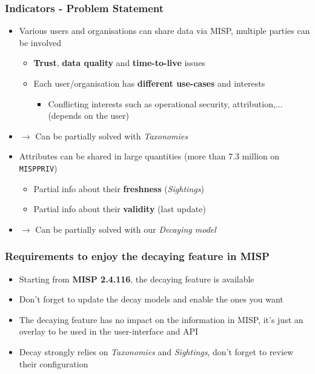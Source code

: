 \begin{frame}
\frametitle{Indicators - Problem Statement}
    \begin{itemize}
        \item Various users and organisations can share data via MISP, multiple parties can be involved
        \begin{itemize}
            \item \textbf{Trust}, \textbf{data quality} and \textbf{time-to-live} issues
            \item Each user/organisation has \textbf{different use-cases} and interests
                \begin{itemize}
                    \item Conflicting interests such as operational security, attribution,... (depends on the user)
                \end{itemize}
        \end{itemize}
        \item[] $\rightarrow$ Can be partially solved with \textit{Taxonomies}
        \pause
        \vspace{0.5cm}
        \item Attributes can be shared in large quantities (more than 7.3 million on \texttt{MISPPRIV})
        \begin{itemize}
            \item Partial info about their \textbf{freshness} (\textit{Sightings})
            \item Partial info about their \textbf{validity} (last update)
        \end{itemize}
        \item[] $\rightarrow$ Can be partially solved with our \textit{Decaying model}
    \end{itemize}
\end{frame}

\begin{frame}
\frametitle{Requirements to enjoy the decaying feature in MISP}
        \begin{itemize}
            \item Starting from \textbf{MISP 2.4.116}, the decaying feature is available
            \item Don't forget to update the decay models and enable the ones you want
            \item The decaying feature has no impact on the information in MISP, it's just an overlay to be used in the user-interface and API
            \item Decay strongly relies on \textit{Taxonomies} and \textit{Sightings}, don't forget to review their configuration
        \end{itemize}
\end{frame}

